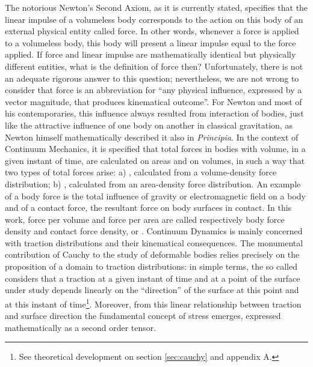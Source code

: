 The notorious Newton's Second Axiom, as it is currently stated, specifies that the linear impulse of a volumeless body corresponds to the action on this body of an external physical entity called force. In other words, whenever a force is applied to a volumeless body, this body will present a linear impulse equal to the force applied. If force and linear impulse are mathematically identical but physically different entities, what is the definition of force then?  Unfortunately, there is not an adequate rigorous answer to this question; nevertheless, we are not wrong to consider that force is an abbreviation for ``any physical influence, expressed by a vector magnitude, that produces kinematical outcome''. For Newton and most of his contemporaries, this influence always resulted from interaction of bodies, just like the attractive influence of one body on another in classical gravitation, as Newton himself mathematically described it also in \emph{Principia}. In the context of Continuum Mechanics, it is specified that total forces in bodies with volume, in a given instant of time, are calculated on areas and on volumes, in such a way that two types of total forces arise: a) , calculated from a volume-density force distribution; b) , calculated from an area-density force distribution. An example of a body force is the total influence of gravity or electromagnetic field on a body and of a contact force, the resultant force on body surfaces in contact. In this work, force per volume and force per area are called respectively body force density and contact force density, or . Continuum Dynamics is mainly concerned with traction distributions and their kinematical consequences. The monumental contribution of Cauchy to the study of deformable bodies relies precisely on the proposition of a domain to traction distributions: in simple terms, the so called  considers that a traction at a given instant of time and at a point of the surface under study depends linearly on the ``direction'' of the surface at this point and at this instant of time\footnote{See theoretical development on section \ref{sec:cauchy} and appendix A.}. Moreover, from this linear relationship between traction and surface direction the fundamental concept of stress emerges, expressed mathematically as a second order tensor.         

